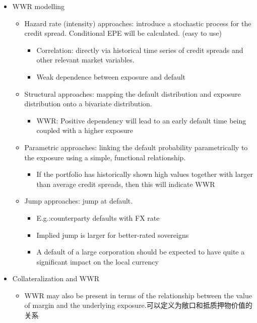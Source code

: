 \begin{itemize}
    \item WWR modelling
    \begin{itemize}
        \item Hazard rate (intensity) approaches: introduce a stochastic process for the credit spread. Conditional EPE will be calculated. (easy to use)
        \begin{itemize}
            \item Correlation: directly via historical time series of credit spreads and other relevant market variables.
            \item Weak dependence between exposure and default
        \end{itemize}
        \item Structural approaches: mapping the default distribution and exposure distribution onto a bivariate distribution.
        \begin{itemize}
            \item WWR: Positive dependency will lead to an early default time being coupled with a higher exposure
        \end{itemize}
        \item Parametric approaches: linking the default probability parametrically to the exposure using a simple, functional relationship.
        \begin{itemize}
            \item If the portfolio has historically shown high values together with larger than average credit spreads, then this will indicate WWR
        \end{itemize}
        \item Jump approaches: jump at default.
        \begin{itemize}
            \item E.g.:counterparty defaults with FX rate
            \item Implied jump is larger for better-rated sovereigns
            \item A default of a large corporation should be expected to have quite a significant impact on the local currency
        \end{itemize}
    \end{itemize}
    \item Collateralization and WWR
    \begin{itemize}
        \item WWR may also be present in terms of the relationship between the value of margin and the underlying exposure.可以定义为敞口和抵质押物价值的关系

\end{itemize}
\end{itemize}
